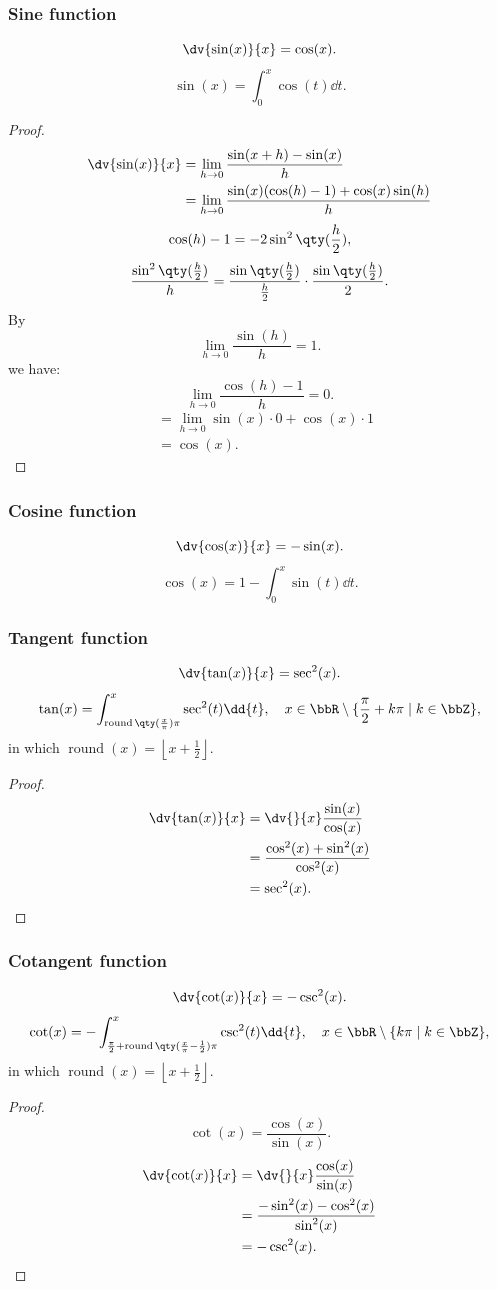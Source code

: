 \documentclass[a4paper,12pt]{report}
\begin{document}
\begin{itemize}
\begin{itemize}
\subsubsection{Sine function}
\[\dv{\sin(x)}{x}=\cos(x).\]
\[\sin(x)=\int_0^x\cos(t)\dd{t}.\]
\begin{proof}
\[\begin{aligned}
\dv{\sin(x)}{x}&=\lim_{h\to 0}\frac{\sin(x+h)-\sin(x)}{h}\\
&=\lim_{h\to 0}\frac{\sin(x)(\cos (h)-1)+\cos(x)\sin(h)}{h}
\end{aligned}\]
\[\cos(h)-1=-2\sin^2\qty(\frac{h}{2}),\]
\[\frac{\sin^2\qty(\frac{h}{2})}{h}=\frac{\sin\qty(\frac{h}{2})}{\frac{h}{2}}\cdot\frac{\sin\qty(\frac{h}{2})}{2}.\]
By
\[\lim_{h\to 0}\frac{\sin(h)}{h}=1.\]
we have:
\[\lim_{h\to 0}\frac{\cos(h)-1}{h}=0.\]
\[\begin{aligned}
&=\lim_{h\to 0}\sin(x)\cdot 0+\cos(x)\cdot 1\\
&=\cos(x).
\end{aligned}\]
\end{proof}
\subsubsection{Cosine function}
\[\dv{\cos(x)}{x}=-\sin(x).\]
\[\cos(x)=1-\int_0^x\sin(t)\dd{t}.\]
\subsubsection{Tangent function}
\[\dv{\tan(x)}{x}=\sec^2(x).\]
\[\tan(x)=\int_{\operatorname{round}\qty(\frac{x}{\pi})\pi}^x\sec^2(t)\dd{t},\quad x\in\bbR\setminus\{\frac{\pi}{2}+k\pi\mid k\in\bbZ\},\]
in which $\operatorname{round}(x)=\left\lfloor x+\frac{1}{2}\right\rfloor$.
\begin{proof}
\[\begin{aligned}
\dv{\tan(x)}{x}&=\dv{}{x}\frac{\sin(x)}{\cos(x)}\\
&=\frac{\cos^2(x)+\sin^2(x)}{\cos^2(x)}\\
&=\sec^2(x).
\end{aligned}\]
\end{proof}
\subsubsection{Cotangent function}
\[\dv{\cot(x)}{x}=-\csc^2(x).\]
\[\cot(x)=-\int_{\frac{\pi}{2}+\operatorname{round}\qty(\frac{x}{\pi}-\frac{1}{2})\pi}^x\csc^2(t)\dd{t},\quad x\in\bbR\setminus\{k\pi\mid k\in\bbZ\},\]
in which $\operatorname{round}(x)=\left\lfloor x+\frac{1}{2}\right\rfloor$.
\begin{proof}
\[\cot(x)=\frac{\cos(x)}{\sin(x)}.\]
\[\begin{aligned}
\dv{\cot(x)}{x}&=\dv{}{x}\frac{\cos(x)}{\sin(x)}\\
&=\frac{-\sin^2(x)-\cos^2(x)}{\sin^2(x)}\\
&=-\csc^2(x).
\end{aligned}\]
\end{proof}

\end{itemize}
\end{itemize}
\end{document}
